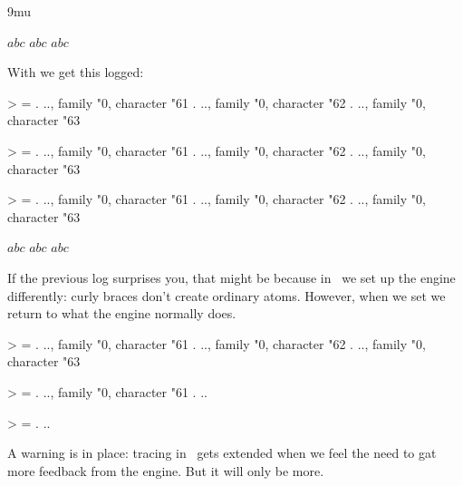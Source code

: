 \startbuffer
\typebuffer[sample]
\startlinecorrection
\setmathspacing\mathordinarycode\mathordinarycode\allmathstyles9mu
\mathgroupingmode\zerocount
\scale[scale=2000]{\showmakeup[mathglue]\showboxes\mathspacingmode\plusone\getbuffer[sample]}
\stoplinecorrection
\blank[2*line]
\stopbuffer

\startbuffer[sample]
$a b c$ \quad $a bc$ \quad $abc$
\stopbuffer

\getbuffer

With  we get this logged:

\starttyping
> \inlinemath=
\noad[ord][...]
.\nucleus
..\mathchar[ord][...], family "0, character "61
\noad[ord][...]
.\nucleus
..\mathchar[ord][...], family "0, character "62
\noad[ord][...]
.\nucleus
..\mathchar[ord][...], family "0, character "63

> \inlinemath=
\noad[ord][...]
.\nucleus
..\mathchar[ord][...], family "0, character "61
\noad[ord][...]
.\nucleus
..\mathchar[ord][...], family "0, character "62
\noad[ord][...]
.\nucleus
..\mathchar[ord][...], family "0, character "63

> \inlinemath=
\noad[ord][...]
.\nucleus
..\mathchar[ord][...], family "0, character "61
\noad[ord][...]
.\nucleus
..\mathchar[ord][...], family "0, character "62
\noad[ord][...]
.\nucleus
..\mathchar[ord][...], family "0, character "63
\stoptyping

\startbuffer[sample]
${a} {b} {c}$ \quad ${a} {bc}$ \quad ${abc}$
\stopbuffer

\getbuffer

If the previous log surprises you, that might be because in \CONTEXT\ we set up
the engine differently: curly braces don't create ordinary atoms. However, when
we set  we return to what the engine normally does.

\starttyping
> \inlinemath=
\noad[ord][...]
.\nucleus
..\mathchar[ord][...], family "0, character "61
\noad[ord][...]
.\nucleus
..\mathchar[ord][...], family "0, character "62
\noad[ord][...]
.\nucleus
..\mathchar[ord][...], family "0, character "63

> \inlinemath=
\noad[ord][...]
.\nucleus
..\mathchar[ord][...], family "0, character "61
\noad[ord][...]
.\nucleus
..

> \inlinemath=
\noad[ord][...]
.\nucleus
..
\stoptyping

A warning is in place: tracing in \LUAMETATEX\ gets extended when we feel the
need to gat more feedback from the engine. But it will only be more.

